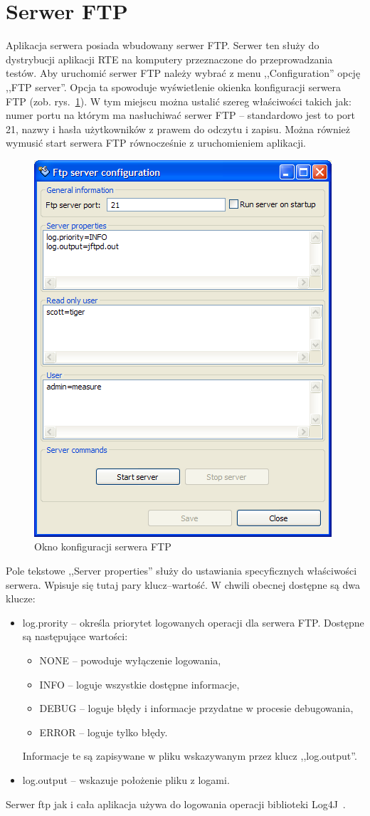 \section{Serwer FTP}
Aplikacja serwera posiada wbudowany serwer FTP. Serwer ten służy do dystrybucji
aplikacji RTE na komputery przeznaczone do przeprowadzania testów. Aby uruchomić
serwer FTP należy wybrać z menu ,,Configuration'' opcję ,,FTP server''. Opcja ta spowoduje
wyświetlenie okienka konfiguracji serwera FTP (zob. rys.~\ref{rys:ftpwindow}). W tym miejscu 
można ustalić szereg właściwości takich jak: numer portu na którym ma nasłuchiwać serwer FTP --
standardowo jest to port 21, nazwy i hasła użytkowników z prawem do odczytu i zapisu. Można
również wymusić start serwera FTP równocześnie z uruchomieniem aplikacji.
\begin{figure}[h]
\begin{center}
\includegraphics[width=0.6\linewidth]{figures/gui/03.png}
\end{center}
\caption{Okno konfiguracji serwera FTP}\label{rys:ftpwindow}
\end{figure}
Pole tekstowe ,,Server properties'' służy do ustawiania specyficznych właściwości serwera.
Wpisuje się tutaj pary klucz--wartość. W chwili obecnej dostępne są dwa klucze:
\begin{itemize}
\item log.prority -- określa priorytet logowanych operacji dla serwera FTP. Dostępne są następujące wartości:
\begin{itemize}
\item NONE -- powoduje wyłączenie logowania,
\item INFO -- loguje wszystkie dostępne informacje,
\item DEBUG -- loguje błędy i informacje przydatne w procesie debugowania,
\item ERROR -- loguje tylko błędy.
\end{itemize}
Informacje te są zapisywane w pliku wskazywanym przez klucz ,,log.output''.
\item log.output -- wskazuje położenie pliku z logami.
\end{itemize}
Serwer ftp jak i cała aplikacja używa do logowania operacji biblioteki Log4J~\cite{Log4J1}.

